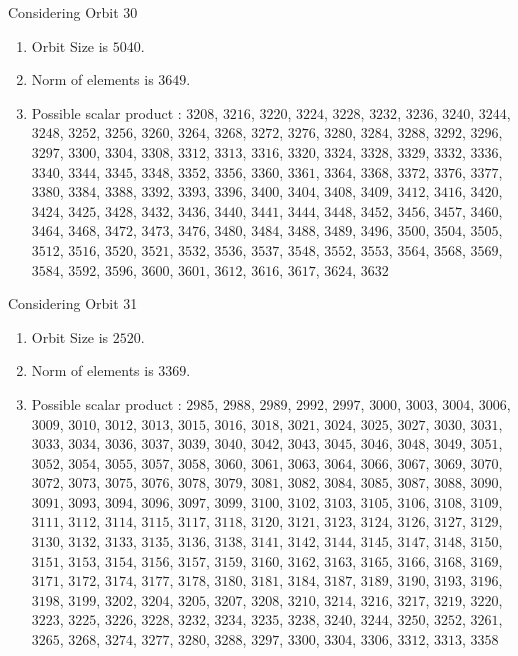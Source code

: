 \documentclass[12pt]{article}
\begin{document}
Considering Orbit 30
\begin{enumerate}
\item Orbit Size is $5040$.
\item Norm of elements is $3649$.
\item Possible scalar product : $3208$, $3216$, $3220$, $3224$, $3228$, $3232$, $3236$, $3240$, $3244$, $3248$, $3252$, $3256$, $3260$, $3264$, $3268$, $3272$, $3276$, $3280$, $3284$, $3288$, $3292$, $3296$, $3297$, $3300$, $3304$, $3308$, $3312$, $3313$, $3316$, $3320$, $3324$, $3328$, $3329$, $3332$, $3336$, $3340$, $3344$, $3345$, $3348$, $3352$, $3356$, $3360$, $3361$, $3364$, $3368$, $3372$, $3376$, $3377$, $3380$, $3384$, $3388$, $3392$, $3393$, $3396$, $3400$, $3404$, $3408$, $3409$, $3412$, $3416$, $3420$, $3424$, $3425$, $3428$, $3432$, $3436$, $3440$, $3441$, $3444$, $3448$, $3452$, $3456$, $3457$, $3460$, $3464$, $3468$, $3472$, $3473$, $3476$, $3480$, $3484$, $3488$, $3489$, $3496$, $3500$, $3504$, $3505$, $3512$, $3516$, $3520$, $3521$, $3532$, $3536$, $3537$, $3548$, $3552$, $3553$, $3564$, $3568$, $3569$, $3584$, $3592$, $3596$, $3600$, $3601$, $3612$, $3616$, $3617$, $3624$, $3632$
\end{enumerate}
Considering Orbit 31
\begin{enumerate}
\item Orbit Size is $2520$.
\item Norm of elements is $3369$.
\item Possible scalar product : $2985$, $2988$, $2989$, $2992$, $2997$, $3000$, $3003$, $3004$, $3006$, $3009$, $3010$, $3012$, $3013$, $3015$, $3016$, $3018$, $3021$, $3024$, $3025$, $3027$, $3030$, $3031$, $3033$, $3034$, $3036$, $3037$, $3039$, $3040$, $3042$, $3043$, $3045$, $3046$, $3048$, $3049$, $3051$, $3052$, $3054$, $3055$, $3057$, $3058$, $3060$, $3061$, $3063$, $3064$, $3066$, $3067$, $3069$, $3070$, $3072$, $3073$, $3075$, $3076$, $3078$, $3079$, $3081$, $3082$, $3084$, $3085$, $3087$, $3088$, $3090$, $3091$, $3093$, $3094$, $3096$, $3097$, $3099$, $3100$, $3102$, $3103$, $3105$, $3106$, $3108$, $3109$, $3111$, $3112$, $3114$, $3115$, $3117$, $3118$, $3120$, $3121$, $3123$, $3124$, $3126$, $3127$, $3129$, $3130$, $3132$, $3133$, $3135$, $3136$, $3138$, $3141$, $3142$, $3144$, $3145$, $3147$, $3148$, $3150$, $3151$, $3153$, $3154$, $3156$, $3157$, $3159$, $3160$, $3162$, $3163$, $3165$, $3166$, $3168$, $3169$, $3171$, $3172$, $3174$, $3177$, $3178$, $3180$, $3181$, $3184$, $3187$, $3189$, $3190$, $3193$, $3196$, $3198$, $3199$, $3202$, $3204$, $3205$, $3207$, $3208$, $3210$, $3214$, $3216$, $3217$, $3219$, $3220$, $3223$, $3225$, $3226$, $3228$, $3232$, $3234$, $3235$, $3238$, $3240$, $3244$, $3250$, $3252$, $3261$, $3265$, $3268$, $3274$, $3277$, $3280$, $3288$, $3297$, $3300$, $3304$, $3306$, $3312$, $3313$, $3358$
\end{enumerate}
\end{document}
